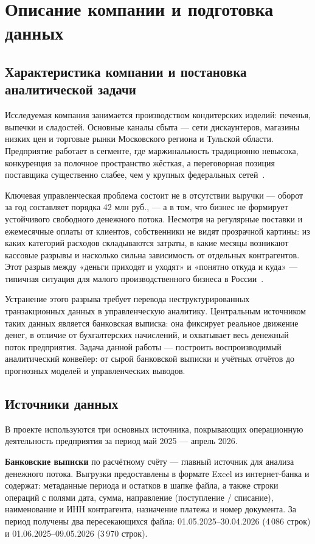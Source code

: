 \chapter{Описание компании и подготовка данных}

\section{Характеристика компании и постановка аналитической задачи}

Исследуемая компания занимается производством кондитерских изделий: печенья, выпечки и сладостей. Основные каналы сбыта --- сети дискаунтеров, магазины низких цен и торговые рынки Московского региона и Тульской области. Предприятие работает в сегменте, где маржинальность традиционно невысока, конкуренция за полочное пространство жёсткая, а переговорная позиция поставщика существенно слабее, чем у крупных федеральных сетей~\cite{sme_profitability_ru}.

Ключевая управленческая проблема состоит не в отсутствии выручки --- оборот за год составляет порядка 42 млн руб., --- а в том, что бизнес не формирует устойчивого свободного денежного потока. Несмотря на регулярные поставки и ежемесячные оплаты от клиентов, собственники не видят прозрачной картины: из каких категорий расходов складываются затраты, в какие месяцы возникают кассовые разрывы и насколько сильна зависимость от отдельных контрагентов. Этот разрыв между «деньги приходят и уходят» и «понятно откуда и куда» --- типичная ситуация для малого производственного бизнеса в России~\cite{sme_profitability_ru}.

Устранение этого разрыва требует перевода неструктурированных транзакционных данных в управленческую аналитику. Центральным источником таких данных является банковская выписка: она фиксирует реальное движение денег, в отличие от бухгалтерских начислений, и охватывает весь денежный поток предприятия. Задача данной работы --- построить воспроизводимый аналитический конвейер: от сырой банковской выписки и учётных отчётов до прогнозных моделей и управленческих выводов.

\section{Источники данных}

В проекте используются три основных источника, покрывающих операционную деятельность предприятия за период май 2025 --- апрель 2026.

\textbf{Банковские выписки} по расчётному счёту --- главный источник для анализа денежного потока. Выгрузки предоставлены в формате Excel из интернет-банка и содержат: метаданные периода и остатков в шапке файла, а также строки операций с полями дата, сумма, направление (поступление / списание), наименование и ИНН контрагента, назначение платежа и номер документа. За период получены два пересекающихся файла: 01.05.2025--30.04.2026 (4\,086 строк) и 01.06.2025--09.05.2026 (3\,970 строк).


